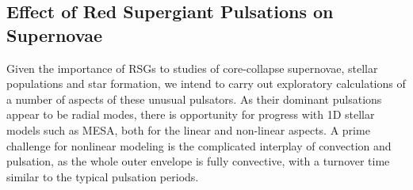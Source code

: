 \subsection{Effect of Red Supergiant Pulsations on Supernovae}

Given the importance of RSGs to studies of core-collapse supernovae, stellar populations and star formation, we intend to carry out exploratory calculations of a number of aspects of these unusual pulsators. As their dominant pulsations appear to be radial modes, there is opportunity for progress with 1D stellar models such as MESA, both for the linear and non-linear aspects. 
A prime challenge for nonlinear modeling is the complicated interplay of convection and pulsation, as the whole outer envelope is fully convective, with a turnover time similar to the typical pulsation periods.   